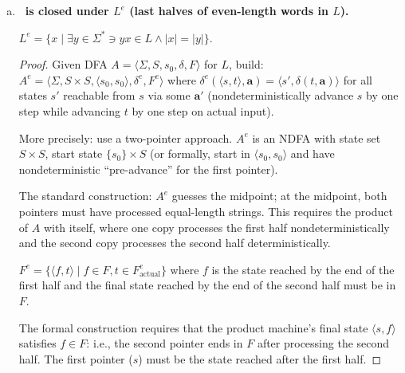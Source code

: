 \begin{enumerate}[{5.}1. ]
\begin{enumerate}[(a)]
\begin{enumerate}[(a)]
  \item \textbf{Example where $\psi^{-1}(\PBAR(L))\neq L$:} Same: $\psi^{-1}(\PBAR(\{\pmb{a}\}))=\psi^{-1}(\{\pmb{a}\})=\emptyset\neq\{\pmb{a}\}=L$.

  \item \textbf{Prove $\PBAR(\psi^{-1}(L))\subseteq L$:} Let $y\in\PBAR(\psi^{-1}(L))$.  Then $y=\psi(x)$ for some $x\in\psi^{-1}(L)$.  Since $x\in\psi^{-1}(L)$, $\psi(x)\in L$, i.e., $y\in L$. \qed

  \item \textbf{Prove $L\subseteq\psi^{-1}(\PBAR(L))$:} Let $x\in L$.  Then $\psi(x)\in\PBAR(L)$ (since $\psi(x)$ is the image of some element of $L$, namely $x$ itself).  Hence $x\in\psi^{-1}(\PBAR(L))$. \qed
\end{enumerate}

\item \textbf{\DSIG\ is closed under $L^e$ (last halves of even-length words in $L$).}

$L^e=\{x\mid\exists y\in\Sigma^*\ni yx\in L\wedge|x|=|y|\}$.

\begin{proof}
Given DFA $A=\langle\Sigma,S,s_0,\delta,F\rangle$ for $L$, build:
$A^e=\langle\Sigma,S\times S,\langle s_0,s_0\rangle,\delta^e,F^e\rangle$ where
$\delta^e(\langle s,t\rangle,\pmb{a})=\langle s',\delta(t,\pmb{a})\rangle$ for all states $s'$ reachable from $s$ via some $\pmb{a}'$ (nondeterministically advance $s$ by one step while advancing $t$ by one step on actual input).

More precisely: use a two-pointer approach.  $A^e$ is an NDFA with state set $S\times S$, start state $\{s_0\}\times S$ (or formally, start in $\langle s_0,s_0\rangle$ and have nondeterministic ``pre-advance'' for the first pointer).

The standard construction: $A^e$ guesses the midpoint; at the midpoint, both pointers must have processed equal-length strings.  This requires the product of $A$ with itself, where one copy processes the first half nondeterministically and the second copy processes the second half deterministically.

$F^e=\{\langle f,t\rangle\mid f\in F,t\in F^e_{\text{actual}}\}$ where $f$ is the state reached by the end of the first half and the final state reached by the end of the second half must be in $F$.

The formal construction requires that the product machine's final state $\langle s,f\rangle$ satisfies $f\in F$: i.e., the second pointer ends in $F$ after processing the second half.  The first pointer ($s$) must be the state reached after the first half.


\end{proof}
\end{enumerate}
\end{enumerate}
